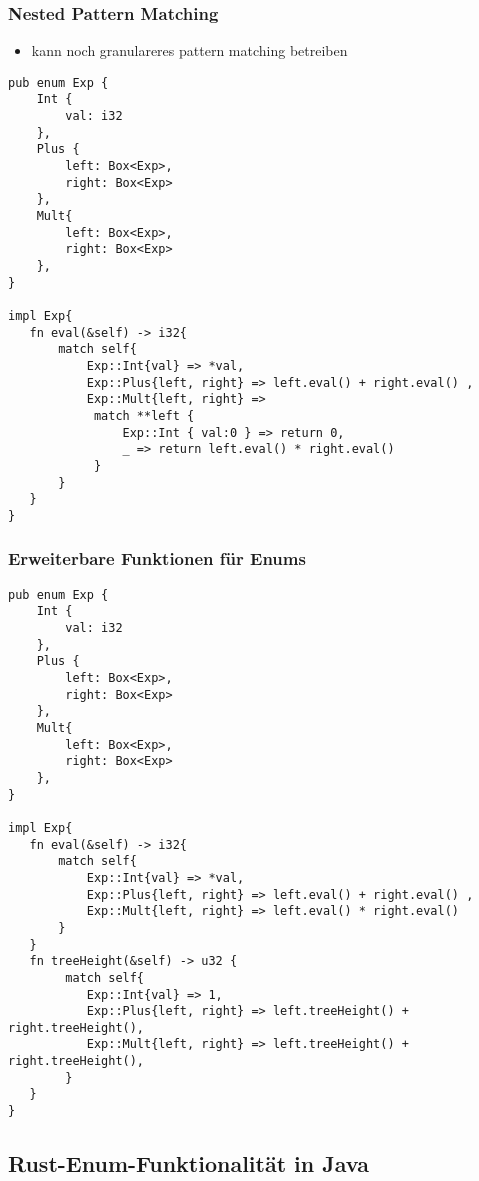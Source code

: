 \documentclass[a4paper, 1ppt]{article}
\begin{document}
\subsubsection{Nested Pattern Matching}
\begin{itemize}
	\item kann noch granulareres pattern matching betreiben
\end{itemize}
\begin{verbatim}
pub enum Exp {
    Int {
        val: i32
    },
    Plus {
        left: Box<Exp>,
        right: Box<Exp>
    },
    Mult{
        left: Box<Exp>,
        right: Box<Exp>
    },
}

impl Exp{
   fn eval(&self) -> i32{
       match self{
           Exp::Int{val} => *val,
           Exp::Plus{left, right} => left.eval() + right.eval() ,
           Exp::Mult{left, right} => 
            match **left {
                Exp::Int { val:0 } => return 0,
                _ => return left.eval() * right.eval()
            }
       }
   }
}
\end{verbatim}
\subsubsection{Erweiterbare Funktionen für Enums}
\begin{verbatim}
pub enum Exp {
    Int {
        val: i32
    },
    Plus {
        left: Box<Exp>,
        right: Box<Exp>
    },
    Mult{
        left: Box<Exp>,
        right: Box<Exp>
    },
}

impl Exp{
   fn eval(&self) -> i32{
       match self{
           Exp::Int{val} => *val,
           Exp::Plus{left, right} => left.eval() + right.eval() ,
           Exp::Mult{left, right} => left.eval() * right.eval()
       }
   }
   fn treeHeight(&self) -> u32 {
		match self{
           Exp::Int{val} => 1,
           Exp::Plus{left, right} => left.treeHeight() + right.treeHeight(),
           Exp::Mult{left, right} => left.treeHeight() + right.treeHeight(),
		} 
   }
}
\end{verbatim}
\subsection{Rust-Enum-Funktionalität in Java}
\end{document}
